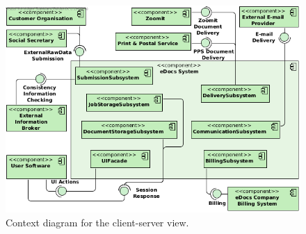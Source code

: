 \begin{figure}[!htp]
    \centering
    \includegraphics[width=\textwidth]{figures/Context Diagram 1.png}
    \caption{Context diagram for the client-server view.}\label{fig:cc-context}
\end{figure}

